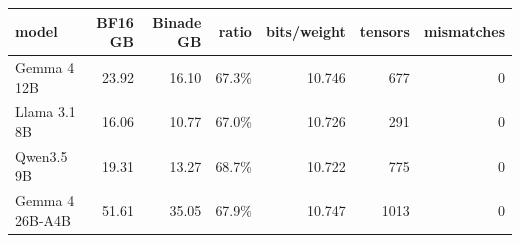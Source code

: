 \begin{tabular}{lrrrrrr}
\toprule
model & BF16 GB & Binade GB & ratio & bits/weight & tensors & mismatches \\
\midrule
Gemma 4 12B & 23.92 & 16.10 & 67.3\% & 10.746 & 677 & 0 \\
Llama 3.1 8B & 16.06 & 10.77 & 67.0\% & 10.726 & 291 & 0 \\
Qwen3.5 9B & 19.31 & 13.27 & 68.7\% & 10.722 & 775 & 0 \\
Gemma 4 26B-A4B & 51.61 & 35.05 & 67.9\% & 10.747 & 1013 & 0 \\
\bottomrule
\end{tabular}
